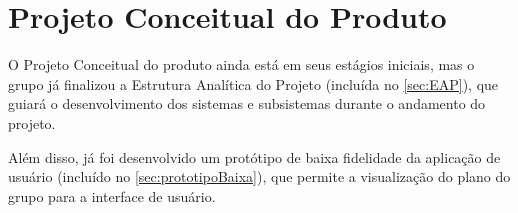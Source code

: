\chapter{Projeto Conceitual do Produto}

O Projeto Conceitual do produto ainda está em seus estágios iniciais, mas o grupo já finalizou a Estrutura Analítica do Projeto (incluída no \cref{sec:EAP}), que guiará o desenvolvimento dos sistemas e subsistemas durante o andamento do projeto.

Além disso, já foi desenvolvido um protótipo de baixa fidelidade da aplicação de usuário (incluído no \cref{sec:prototipoBaixa}), que permite a visualização do plano do grupo para a interface de usuário.








